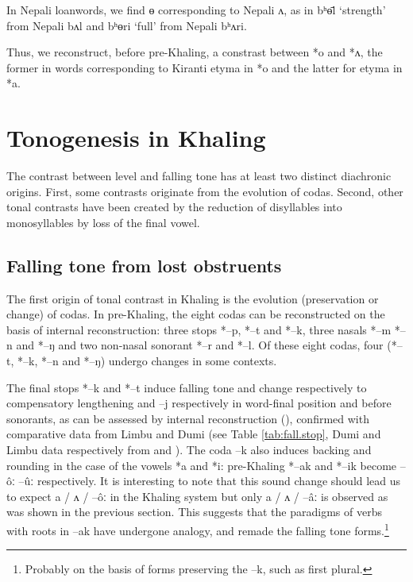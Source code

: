 \documentclass[oldfontcommands,oneside,a4paper,11pt]{article}
\newcommand{\ipa}[1]{{\phon \mbox{#1}}} %
\begin{document}
In Nepali loanwords, we find \ipa{ɵ} corresponding to Nepali  \ipa{ʌ}, as in \ipa{bʰɵ̄l}	`strength' from Nepali \ipa{bʌl} and \ipa{bʰɵri}	`full' from Nepali \ipa{bʰʌri}.

Thus, we reconstruct, before pre-Khaling, a constrast between *o and *ʌ, the former in words corresponding to Kiranti etyma in *o and the latter for etyma in *a.


\section{Tonogenesis in Khaling}
The contrast between level and falling tone has at least two distinct diachronic origins. First, some contrasts originate from the evolution of codas. Second, other tonal contrasts have been created by the reduction of disyllables into monosyllables by loss of the final vowel.


\subsection{Falling tone from lost obstruents} \label{sec:obstruents}
 The first origin of tonal contrast in Khaling is the evolution (preservation or change) of codas. In pre-Khaling, the eight codas can be reconstructed on the basis of internal reconstruction: three stops *--p, *--t and *--k, three nasals *--m *--n and *--ŋ and two non-nasal sonorant *--r and *--l. Of these eight codas, four (*--t, *--k, *--n and *--ŋ) undergo changes in some contexts. 


The final stops *\ipa{--k} and *\ipa{--t} induce falling tone and change respectively to compensatory lengthening and \ipa{--j} respectively in word-final position and before sonorants, as can be assessed by internal reconstruction (\citealt{jacques12khaling}), confirmed with comparative data from Limbu and Dumi (see Table \ref{tab:fall.stop}, Dumi and Limbu data respectively from \citealt{driem93dumi} and \citealt{michailovsky02dico}). The coda \ipa{--k} also induces backing and rounding in the case of the vowels *a and *i: pre-Khaling *--ak and *--ik become \ipa{--ôː} \ipa{--ûː} respectively. It is interesting to note that this sound change should lead us to expect \ipa{a} / \ipa{ʌ} / \ipa{--ôː} in the Khaling system but only \ipa{a} / \ipa{ʌ} / \ipa{--âː} is observed as was shown in the previous section. This suggests that the paradigms of verbs with roots in \ipa{--ak} have undergone analogy, and remade the falling tone forms.\footnote{Probably on the basis of forms preserving the \ipa{--k}, such as   first plural.}
\end{document}

